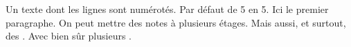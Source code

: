 \renewcommand*{\thefootnoteB}{\roman{footnoteB}}
\beginnumbering
\pstart
Un texte dont les lignes sont numérotés.
Par défaut de 5 en 5.
Ici le premier paragraphe.
On peut mettre des notes à plusieurs étages.
Mais aussi, et surtout, des
.
Avec bien sûr plusieurs .
\pend
\endnumbering
